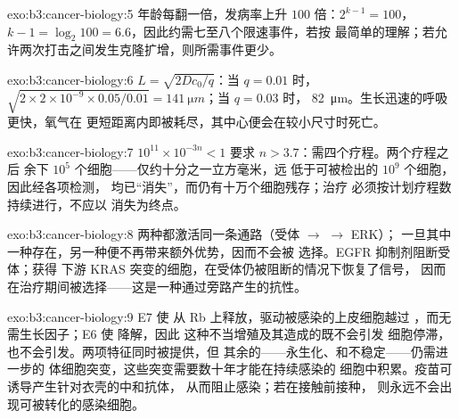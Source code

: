 \begin{solution}{exo:b3:cancer-biology:5}
年龄每翻一倍，发病率上升 $100$ 倍：$2^{k-1} = 100$，$k - 1 =
\log_{2}100 = 6.6$，因此约需七至八个限速事件，若按
最简单的理解；若允许两次打击之间发生克隆扩增，则所需事件更少。
\end{solution}

\begin{solution}{exo:b3:cancer-biology:6}
$L = \sqrt{2Dc_{0}/q}$：当 $q = 0.01$ 时，$\sqrt{2\times 2\times 10^{-9}
\times 0.05/0.01} = \qty{141}{\micro m}$；当 $q = 0.03$ 时，
\qty{82}{\micro m}。生长迅速的呼吸更快，氧气在
更短距离内即被耗尽，其中心便会在较小尺寸时死亡。
\end{solution}

\begin{solution}{exo:b3:cancer-biology:7}
$10^{11}\times 10^{-3n} < 1$ 要求 $n > 3.7$：需四个疗程。两个疗程之后
余下 $10^{5}$ 个细胞——仅约十分之一立方毫米，远
低于可被检出的 $10^{9}$ 个细胞，因此经各项检测，
均已“消失”，而仍有十万个细胞残存；治疗
必须按计划疗程数持续进行，不应以
消失为终点。
\end{solution}

\begin{solution}{exo:b3:cancer-biology:8}
两种都激活同一条通路（受体 $\to$  $\to$ ERK）；
一旦其中一种存在，另一种便不再带来额外优势，因而不会被
选择。EGFR 抑制剂阻断受体；获得
下游 KRAS 突变的细胞，在受体仍被阻断的情况下恢复了信号，
因而在治疗期间被选择——这是一种通过旁路产生的抗性。
\end{solution}

\begin{solution}{exo:b3:cancer-biology:9}
E7 使  从 Rb 上释放，驱动被感染的上皮细胞越过
，而无需生长因子；E6 使  降解，因此
这种不当增殖及其造成的既不会引发
细胞停滞，也不会引发。两项特征同时被提供，但
其余的——永生化、和不稳定——仍需进一步的
体细胞突变，这些突变需要数十年才能在持续感染的
细胞中积累。疫苗可诱导产生针对衣壳的中和抗体，
从而阻止感染；若在接触前接种，
则永远不会出现可被转化的感染细胞。
\end{solution}

